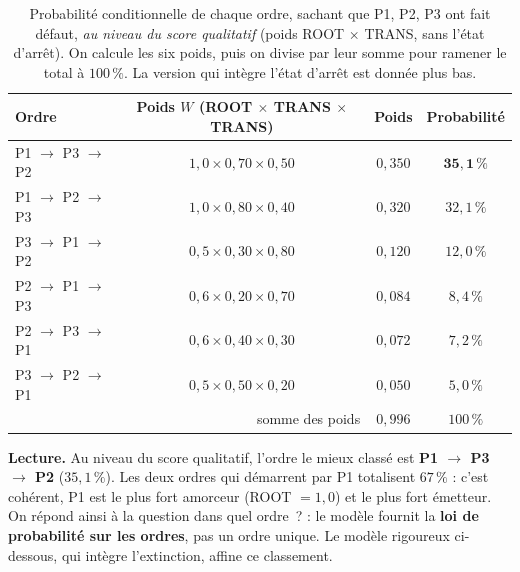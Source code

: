 \documentclass[11pt,a4paper]{article}
\begin{document}
\begin{table}[h]\centering\small
\renewcommand{\arraystretch}{1.3}
\begin{tabular}{@{}lccc@{}}
\toprule
Ordre & Poids $W$ (ROOT $\times$ TRANS $\times$ TRANS) & Poids & Probabilité \\
\midrule
\rowcolor{lightblue!40} P1 $\to$ P3 $\to$ P2 & $1{,}0 \times 0{,}70 \times 0{,}50$ & $0{,}350$ & $\mathbf{35{,}1\,\%}$ \\
P1 $\to$ P2 $\to$ P3 & $1{,}0 \times 0{,}80 \times 0{,}40$ & $0{,}320$ & $32{,}1\,\%$ \\
P3 $\to$ P1 $\to$ P2 & $0{,}5 \times 0{,}30 \times 0{,}80$ & $0{,}120$ & $12{,}0\,\%$ \\
P2 $\to$ P1 $\to$ P3 & $0{,}6 \times 0{,}20 \times 0{,}70$ & $0{,}084$ & $8{,}4\,\%$ \\
P2 $\to$ P3 $\to$ P1 & $0{,}6 \times 0{,}40 \times 0{,}30$ & $0{,}072$ & $7{,}2\,\%$ \\
P3 $\to$ P2 $\to$ P1 & $0{,}5 \times 0{,}50 \times 0{,}20$ & $0{,}050$ & $5{,}0\,\%$ \\
\midrule
\multicolumn{2}{r}{somme des poids} & $0{,}996$ & $100\,\%$ \\
\bottomrule
\end{tabular}
\caption{Probabilité conditionnelle de chaque ordre, sachant que P1, P2, P3 ont fait défaut,
\emph{au niveau du score qualitatif} (poids ROOT $\times$ TRANS, sans l'état d'arrêt). On calcule
les six poids, puis on divise par leur somme pour ramener le total à $100\,\%$. La version qui
intègre l'état d'arrêt est donnée plus bas.}
\end{table}

\begin{cle}
\textbf{Lecture.} Au niveau du score qualitatif, l'ordre le mieux classé est
\textbf{P1 $\to$ P3 $\to$ P2} ($35{,}1\,\%$). Les deux ordres qui démarrent par P1 totalisent
$67\,\%$ : c'est cohérent, P1 est le plus fort amorceur (ROOT $=1{,}0$) et le plus fort émetteur.
On répond ainsi à la question \og{}dans quel ordre~?\fg{} : le modèle fournit la \textbf{loi de
probabilité sur les ordres}, pas un ordre unique. Le modèle rigoureux ci-dessous, qui intègre
l'extinction, affine ce classement.
\end{cle}
\end{document}
